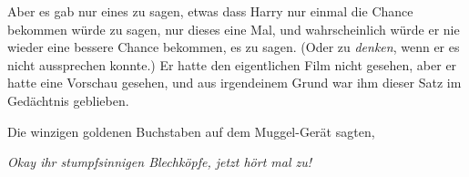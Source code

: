 Aber es gab nur eines zu sagen, etwas dass Harry nur einmal die Chance bekommen würde zu sagen, nur dieses eine Mal, und wahrscheinlich würde er nie wieder eine bessere Chance bekommen, es zu sagen. (Oder zu \emph{denken}, wenn er es nicht aussprechen konnte.) Er hatte den eigentlichen Film nicht gesehen, aber er hatte eine Vorschau gesehen, und aus irgendeinem Grund war ihm dieser Satz im Gedächtnis geblieben.

Die winzigen goldenen Buchstaben auf dem Muggel-Gerät sagten,

\emph{Okay ihr stumpfsinnigen Blechköpfe, jetzt hört mal zu!}

